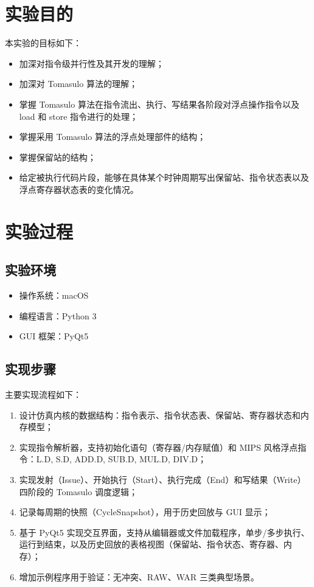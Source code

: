 \documentclass[12pt,a4paper]{ctexart}
\title{\reporttitle}
\author{\authname：\underline{李祥熙} \quad \authid：\underline{2234412799}}
\date{\today}
\begin{document}
\maketitle
\tableofcontents
\newpage

\section{实验目的}
本实验的目标如下：
\begin{itemize}
  \item 加深对指令级并行性及其开发的理解；
  \item 加深对 Tomasulo 算法的理解；
  \item 掌握 Tomasulo 算法在指令流出、执行、写结果各阶段对浮点操作指令以及 load 和 store 指令进行的处理；
  \item 掌握采用 Tomasulo 算法的浮点处理部件的结构；
  \item 掌握保留站的结构；
  \item 给定被执行代码片段，能够在具体某个时钟周期写出保留站、指令状态表以及浮点寄存器状态表的变化情况。
\end{itemize}

\section{实验过程}
\subsection{实验环境}
\begin{itemize}
  \item 操作系统：macOS
  \item 编程语言：Python 3
  \item GUI 框架：PyQt5
\end{itemize}

\subsection{实现步骤}
主要实现流程如下：
\begin{enumerate}
  \item 设计仿真内核的数据结构：指令表示、指令状态表、保留站、寄存器状态和内存模型；
  \item 实现指令解析器，支持初始化语句（寄存器/内存赋值）和 MIPS 风格浮点指令：L.D, S.D, ADD.D, SUB.D, MUL.D, DIV.D；
  \item 实现发射（Issue）、开始执行（Start）、执行完成（End）和写结果（Write）四阶段的 Tomasulo 调度逻辑；
  \item 记录每周期的快照（CycleSnapshot），用于历史回放与 GUI 显示；
  \item 基于 PyQt5 实现交互界面，支持从编辑器或文件加载程序，单步/多步执行、运行到结束，以及历史回放的表格视图（保留站、指令状态、寄存器、内存）；
  \item 增加示例程序用于验证：无冲突、RAW、WAR 三类典型场景。
\end{enumerate}
\end{document}
